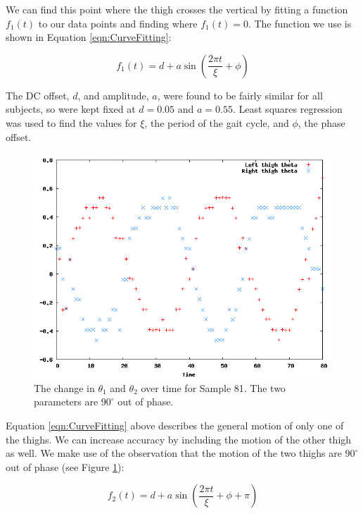 We can find this point where the thigh crosses the vertical by fitting a function $f_1(t)$ to our data points and finding where $f_1(t) = 0$.
The function we use is shown in Equation \ref{eqn:CurveFitting}:

\begin{equation}
	f_1(t) = d + a \sin(\frac{2 \pi t}{\xi} + \phi)
	\label{eqn:CurveFitting}
\end{equation}

The DC offset, $d$, and amplitude, $a$, were found to be fairly similar for all subjects, so were kept fixed at $d = 0.05$ and $a = 0.55$.
Least squares regression was used to find the values for $\xi$, the period of the gait cycle, and $\phi$, the phase offset.

\begin{figure}[tb]
	\centering
	\includegraphics[width=\textwidth]{curvefitting2.png}
	\caption{The change in $\theta_1$ and $\theta_2$ over time for Sample 81.
		The two parameters are $90^\circ$ out of phase.}
	\label{CurveFitting2}
\end{figure}

Equation \ref{eqn:CurveFitting} above describes the general motion of only one of the thighs.
We can increase accuracy by including the motion of the other thigh as well.
We make use of the observation that the motion of the two thighs are $90^\circ$ out of phase (see Figure \ref{CurveFitting2}):

\begin{equation}
	f_2(t) = d + a \sin(\frac{2 \pi t}{\xi} + \phi + \pi)
	\label{eqn:CurveFitting2}
\end{equation}

